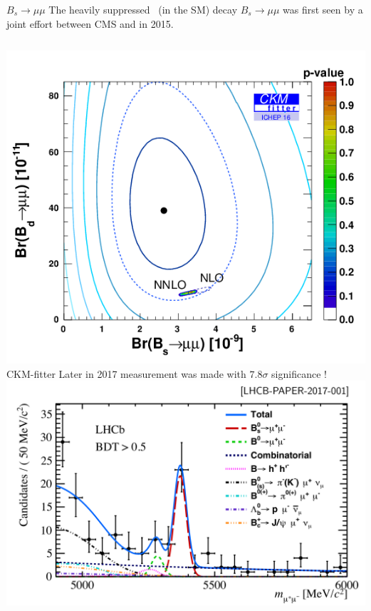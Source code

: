 \documentclass[9pt,usenames,dvipsnames]{beamer}
\begin{document}
\begin{frame}{$B_{s} \to \mu \mu$ }
The heavily suppressed~ (in the  SM) decay $ B_s \to \mu \mu$ was first seen by a joint effort between CMS and \LHCb in 2015.
	\begin{columns}[c]
		\centering
		\includegraphics[width= \textwidth]{./assets/BsBdtomumu}\\ {\tiny CKM-fitter}
Later in 2017 \LHCb measurement was made with $ 7.8 \sigma$ significance !
\includegraphics[width= 1.1\textwidth]{./assets/bsmumu_2017_LHCb} \\ {\tiny {}}
	\end{columns}
\end{frame}
\end{document}
